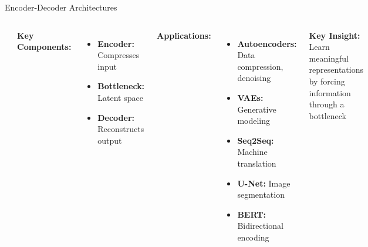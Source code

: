 \documentclass[aspectratio=169]{beamer}
\begin{document}
\begin{frame}{Encoder-Decoder Architectures}
  \begin{columns}
    \begin{center}
      \includegraphics[width=\textwidth]{images/encoderDecoder.png}
    \end{center}
    
    \vspace{0.3cm}
    \textbf{Key Components:}
    \small
    \begin{itemize}
      \item \textbf{Encoder:} Compresses input
      \item \textbf{Bottleneck:} Latent space
      \item \textbf{Decoder:} Reconstructs output
    \end{itemize}
    
    \textbf{Applications:}
    \begin{itemize}
      \item \textbf{Autoencoders:} Data compression, denoising
      \item \textbf{VAEs:} Generative modeling
      \item \textbf{Seq2Seq:} Machine translation
      \item \textbf{U-Net:} Image segmentation
      \item \textbf{BERT:} Bidirectional encoding
    \end{itemize}
    
    \vspace{0.3cm}
    \textbf{Key Insight:} Learn meaningful representations by forcing information through a bottleneck
  \end{columns}
\end{frame}
\end{document}
